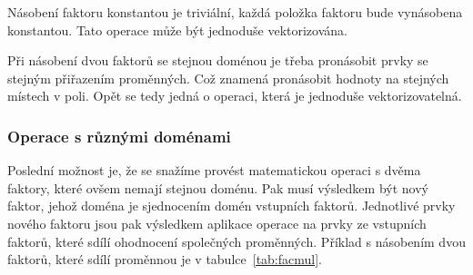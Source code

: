 Násobení faktoru konstantou je triviální, každá položka faktoru bude vynásobena konstantou.
Tato operace může být jednoduše vektorizována.

Při násobení dvou faktorů se stejnou doménou je třeba pronásobit prvky se stejným přiřazením proměnných.
Což znamená pronásobit hodnoty na stejných místech v poli.
Opět se tedy jedná o operaci, která je jednoduše vektorizovatelná.

\subsubsection{Operace s různými doménami}

Poslední možnost je, že se snažíme provést matematickou operaci s dvěma faktory, které ovšem nemají stejnou doménu.
Pak musí výsledkem být nový faktor, jehož doména je sjednocením domén vstupních faktorů.
Jednotlivé prvky nového faktoru jsou pak výsledkem aplikace operace na prvky ze vstupních faktorů, které sdílí ohodnocení společných proměnných. 
Příklad s násobením dvou faktorů, které sdílí proměnnou je v tabulce~\ref{tab:facmul}.

